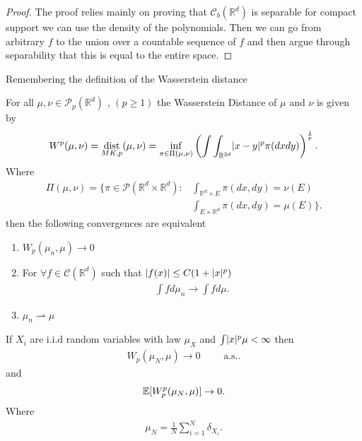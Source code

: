 \begin{proof}
 The proof relies mainly on proving that $\mathcal{C}_b(\mathbb{R}^{d} )$  is separable for compact support 
 we can use the density of the polynomials. Then we can go from arbitrary $f$ to the union over a countable sequence of $f$ 
 and then argue through separability that this is equal to the entire space.
\end{proof}
Remembering the definition of the Wasserstein distance 
\begin{definition}
  For all $\mu , \nu  \in  \mathcal{P}_p(\mathbb{R}^{d} )$  , $(p\ge 1) $ the Wasserstein Distance of $\mu $ and $\nu $ is given by 
  \begin{align*}
    W^{p}(\mu ,\nu ) = \operatorname*{dist}_{MK,p}(\mu ,\nu ) = \inf_{\pi \in  \Pi(\mu ,\nu )} \left( \int \int_{\mathbb{R}^{2d} } \lvert x-y\rvert^{p} \pi(dxdy) \right)^{\frac{1}{p}}  
  .\end{align*}
  Where  
  \begin{align*}
    \Pi(\mu ,\nu ) = \{\pi \in \mathcal{P}(\mathbb{R}^{d} \times  \mathbb{R}^{d}  ) : &\int_{\mathbb{R}^{d}\times E } \pi(dx,dy) = \nu(E) \\
                                                                                      &\int_{E \times  \mathbb{R}^{d} } \pi(dx,dy) = \mu(E)\}  
  .\end{align*}
  then the following convergences are equivalent
  \begin{enumerate}
   \item $W_p(\mu_n,\mu ) \to 0$
    \item  For $\forall f \in \mathcal{C}(\mathbb{R}^{d} )$ such that $\lvert f(x)\rvert \le  C(1+\lvert x\rvert^{p} )$
     \begin{align*}
      \int  f d\mu_n \to \int  f d\mu 
     .\end{align*} 
    \item $\mu_n \rightharpoonup \mu $
  \end{enumerate}
\end{definition}
\begin{corollary}
 If $X_i$  are i.i.d random variables with law $\mu_X$ and $\int \lvert x\rvert^{p} \mu  < \infty $ then
 \begin{align*} 
 W_p(\mu_N,\mu ) \to  0 \qquad \text{ a.s.}
 .\end{align*}
 and 
 \begin{align*}
   \mathbb{E}[W_p^{p}(\mu_N,\mu ) ] \to 0
 .\end{align*}
 Where 
 \begin{align*}
   \mu_N = \frac{1}{N} \sum_{i=1}^{N} \delta_{X_i} 
 .\end{align*}
\end{corollary}
